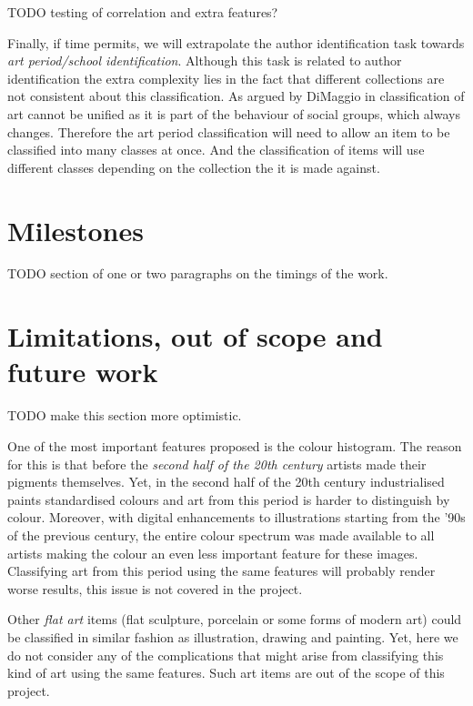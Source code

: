 \documentclass[a4paper]{article}
\begin{document}
TODO testing of correlation and extra features?

Finally, if time permits, we will extrapolate the author identification task
towards \emph{art period/school identification}.  Although this task is related
to author identification the extra complexity lies in the fact that different
collections are not consistent about this classification.  As argued by
DiMaggio in \cite{dimaggio87art} classification of art cannot be unified as it
is part of the behaviour of social groups, which always changes.  Therefore the
art period classification will need to allow an item to be classified into many
classes at once.  And the classification of items will use different classes
depending on the collection the it is made against.

\section{Milestones}

TODO section of one or two paragraphs on the timings of the work.

\section{Limitations, out of scope and future work}

TODO make this section more optimistic.

One of the most important features proposed is the colour histogram.  The
reason for this is that before the \emph{second half of the 20th century}
artists made their pigments themselves.  Yet, in the second half of the 20th
century industrialised paints standardised colours and art from this period is
harder to distinguish by colour.  Moreover, with digital enhancements to
illustrations starting from the '90s of the previous century, the entire colour
spectrum was made available to all artists making the colour an even less
important feature for these images.  Classifying art from this period using the
same features will probably render worse results, this issue is not covered in
the project.

Other \emph{flat art} items (flat sculpture, porcelain or some forms of modern
art) could be classified in similar fashion as illustration, drawing and
painting.  Yet, here we do not consider any of the complications that might
arise from classifying this kind of art using the same features.  Such art
items are out of the scope of this project.



\end{document}

